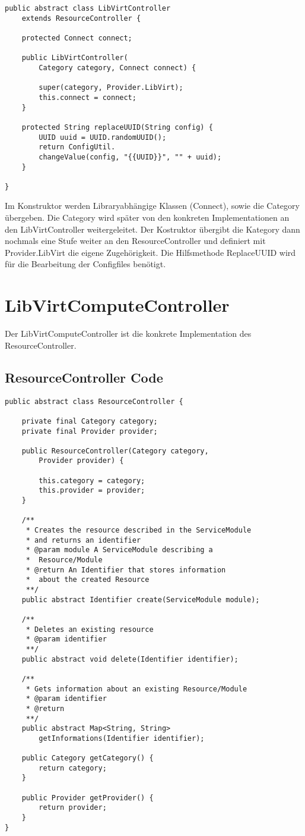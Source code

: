 \begin{lstlisting}[style=java,frame=single] 
public abstract class LibVirtController 
	extends ResourceController {
	
	protected Connect connect;
	
	public LibVirtController(
		Category category, Connect connect) {
		
		super(category, Provider.LibVirt);
		this.connect = connect;
	}
	
	protected String replaceUUID(String config) {
		UUID uuid = UUID.randomUUID();
		return ConfigUtil.
		changeValue(config, "{{UUID}}", "" + uuid);
	}

}
\end{lstlisting}
Im Konstruktor werden Libraryabhängige Klassen (Connect), sowie die Category übergeben. Die Category wird später von den konkreten Implementationen an den LibVirtController weitergeleitet. Der Kostruktor übergibt die Kategory dann nochmals eine Stufe weiter an den ResourceController und definiert mit Provider.LibVirt die eigene Zugehörigkeit.
Die Hilfsmethode ReplaceUUID wird für die Bearbeitung der Configfiles benötigt.

\newpage
\section{LibVirtComputeController}
Der LibVirtComputeController ist die konkrete Implementation des ResourceController.

\subsection{ResourceController Code}
\begin{lstlisting}[style=java,frame=single] 
public abstract class ResourceController {
	
	private final Category category;
	private final Provider provider;
	
	public ResourceController(Category category, 
		Provider provider) {
		
		this.category = category;
		this.provider = provider;
	}
	
	/**
	 * Creates the resource described in the ServiceModule
	 * and returns an identifier
	 * @param module A ServiceModule describing a 
	 *	Resource/Module
	 * @return An Identifier that stores information 
	 *	about the created Resource
	 **/
	public abstract Identifier create(ServiceModule module);
	
	/**
	 * Deletes an existing resource
	 * @param identifier 
	 **/
	public abstract void delete(Identifier identifier);
	
	/**
	 * Gets information about an existing Resource/Module
	 * @param identifier
	 * @return 
	 **/
	public abstract Map<String, String> 
		getInformations(Identifier identifier);
	
	public Category getCategory() {
		return category;
	}
	
	public Provider getProvider() {
		return provider;
	}
}
\end{lstlisting}

